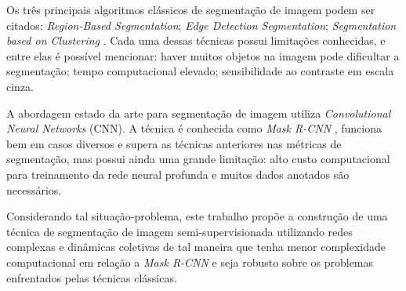 Os três principais algoritmos clássicos de segmentação de imagem podem
ser citados: \textit{Region-Based Segmentation}; \textit{Edge Detection
  Segmentation}; \textit{Segmentation based on Clustering}
\cite{ImageSegmentationTechniques1985}. Cada uma dessas técnicas
possui limitações conhecidas, e entre elas é possível mencionar: haver
muitos objetos na imagem pode dificultar a segmentação; tempo
computacional elevado; sensibilidade ao contraste em escala cinza.

A abordagem estado da arte para segmentação de imagem utiliza
\textit{Convolutional Neural Networks} (\gls{CNN}). A técnica é conhecida
como \textit{Mask R-CNN} \cite{he2018mask}, funciona bem em casos
diversos e supera as técnicas anteriores nas métricas de segmentação,
mas possui ainda uma grande limitação: alto custo computacional para
treinamento da rede neural profunda e muitos dados anotados são necessários.

Considerando tal situação-problema, este trabalho propõe a construção
de uma técnica de segmentação de imagem semi-supervisionada utilizando
redes complexas e dinâmicas coletivas de tal maneira que tenha menor
complexidade computacional em relação a \textit{Mask R-CNN} e seja
robusto sobre os problemas enfrentados pelas técnicas clássicas.
